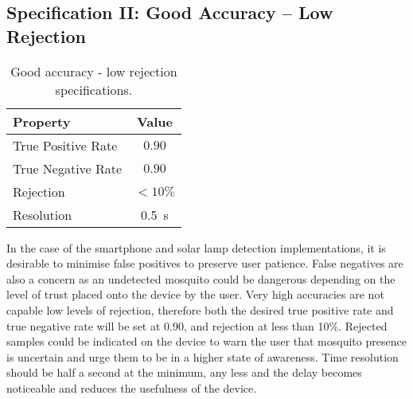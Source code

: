     \subsection{Specification II: Good Accuracy -- Low Rejection}
    \label{subsec:exp-spec-lowrej}
        \begin{wraptable}{r}{0.3\textwidth}
            \scriptsize
            \singlespacing
            \centering
                \begin{tabular}{ |l||c| } 
                    \hline
                    Property & Value \\ 
                    \hline
                    \hline
                    True Positive Rate & $0.90$ \\
                    True Negative Rate & $0.90$ \\
                    Rejection & $<10\%$ \\
                    Resolution & \SI{0.5}{\second}\\
                    \hline
                \end{tabular}
            \caption{Good accuracy - low rejection specifications.}
            \label{tbl:exp-spec-lowrej-tbl}
        \end{wraptable} 
        In the case of the smartphone and solar lamp detection implementations, it is desirable to minimise false positives to preserve user patience. False negatives are also a concern as an undetected mosquito could be dangerous depending on the level of trust placed onto the device by the user. Very high accuracies are not capable low levels of rejection, therefore both the desired true positive rate and true negative rate will be set at 0.90, and rejection at less than 10\%. Rejected samples could be indicated on the device to warn the user that mosquito presence is uncertain and urge them to be in a higher state of awareness. Time resolution should be half a second at the minimum, any less and the delay becomes noticeable and reduces the usefulness of the device.
        

